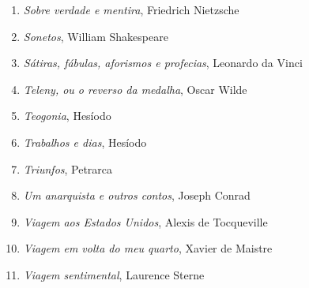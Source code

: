 \begin{enumerate}
\item \textit{Sobre verdade e mentira}, Friedrich Nietzsche
\item \textit{Sonetos}, William Shakespeare
\item \textit{Sátiras, fábulas, aforismos e profecias}, Leonardo da Vinci
\item \textit{Teleny, ou o reverso da medalha}, Oscar Wilde
\item \textit{Teogonia}, Hesíodo
\item \textit{Trabalhos e dias}, Hesíodo
\item \textit{Triunfos}, Petrarca
\item \textit{Um anarquista e outros contos}, Joseph Conrad
\item \textit{Viagem aos Estados Unidos}, Alexis de Tocqueville
\item \textit{Viagem em volta do meu quarto}, Xavier de Maistre 
\item \textit{Viagem sentimental}, Laurence Sterne
\end{enumerate}

\medskip
{}

